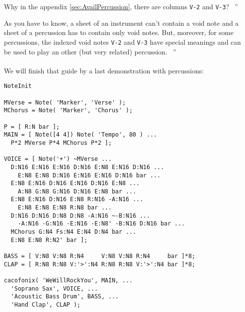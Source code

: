 \documentclass{article}
\newenvironment{meenv}{ \par \noindent \makebox[6em][r]{ \textcolor{mecolor}{Me}: `` --~}}{~''}
\newenvironment{myselfenv}{ \par \noindent \makebox[6em][r]{ \textcolor{myselfcolor}{Myself}: `` --~}}{~''}
\begin{document}
\begin{meenv}%
  Why in the appendix \ref{sec:AvailPercussion}, there are columns \lstinline!V-2! and \lstinline!V-3!?%
\end{meenv}
\begin{myselfenv}%
  As you have to know, a sheet of an instrument can't contain a void note and a sheet of a percussion has to contain only void notes. But, moreover, for some percussions, the indexed void notes \lstinline!V-2! and \lstinline!V-3! have special meanings and can be used to play an other (but very related) percussion.%
\end{myselfenv}

\paragraph{}

We will finish that guide by a last demonstration with percussions:


\begin{lstlisting}
NoteInit

MVerse = Note( 'Marker', 'Verse' );
MChorus = Note( 'Marker', 'Chorus' );

P = [ R:N bar ];
MAIN = [ Note([4 4]) Note( 'Tempo', 80 ) ...
  P*2 MVerse P*4 MChorus P*2 ];

VOICE = [ Note('+') ~MVerse ...
  D:N16 E:N16 E:N16 D:N16 E:N8 E:N16 D:N16 ...
    E:N8 E:N8 D:N16 E:N16 E:N16 D:N16 bar ...
  E:N8 E:N16 D:N16 E:N16 D:N16 E:N8 ...
    A:N8 G:N8 G:N16 D:N16 E:N8 bar ...
  E:N8 E:N16 D:N16 E:N8 R:N16 -A:N16 ...
    E:N8 E:N8 E:N8 R:N8 bar ...
  D:N16 D:N16 D:N8 D:N8 -A:N16 ~-B:N16 ...
    -A:N16 -G:N16 -E:N16 -E:N8' -B:N16 D:N16 bar ...
  MChorus G:N4 Fs:N4 E:N4 D:N4 bar ...
  E:N8 E:N8 R:N2' bar ];

BASS = [ V:N8 V:N8 R:N4     V:N8 V:N8 R:N4     bar ]*8;
CLAP = [ R:N8 R:N8 V:'>':N4 R:N8 R:N8 V:'>':N4 bar ]*8;

cacofonix( 'WeWillRockYou', MAIN, ...
  'Soprano Sax', VOICE, ...
  'Acoustic Bass Drum', BASS, ...
  'Hand Clap', CLAP );
\end{lstlisting}
\end{document}
